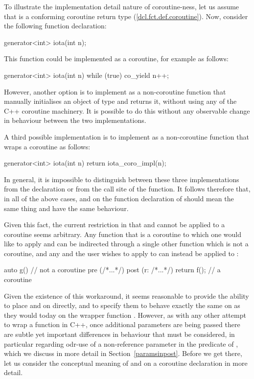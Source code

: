 To illustrate the implementation detail nature of coroutine-ness, let us assume that  is a conforming coroutine return type (\href{https://eel.is/c++draft/dcl.fct.def.coroutine}{[dcl.fct.def.coroutine]}). Now, consider the following function declaration:
\begin{codeblock}
generator<int> iota(int n); 
\end{codeblock}
This function could be implemented as a coroutine, for example as follows:
\begin{codeblock}
generator<int> iota(int n) {
  while (true)
    co_yield n++;
}
\end{codeblock}
However, another option is to implement  as a non-coroutine function that manually initialises an object of type  and returns it, without using any of the C++ coroutine machinery. It is possible to do this without any observable change in behaviour between the two implementations.

A third possible implementation is to implement  as a non-coroutine function that wraps a coroutine  as follows:
\begin{codeblock}
generator<int> iota(int n) {
  return iota_coro_impl(n);
}
\end{codeblock}
In general, it is impossible to distinguish between these three implementations from the declaration or from the call site of the function. It follows therefore that, in all of the above cases,  and  on the function declaration of  should mean the same thing and have the same behaviour.

Given this fact, the current restriction in \cite{P2900R8} that  and  cannot be applied to a coroutine seems arbitrary. Any function  that is a coroutine to which one would like to apply  and  can be indirected through a single other function  which is not a coroutine, and any  and  the user wishes to apply to  can instead be applied to :
\begin{codeblock}
auto g()  // not a coroutine
  pre (/*...*/) 
  post (r: /*...*/) 
{ 
  return f();  // a coroutine
} 
\end{codeblock}
Given the existence of this workaround, it seems reasonable to provide the ability to place  and  on  directly, and to specify them to behave exactly the same on  as they would today on the wrapper function . However, as with any other attempt to wrap a function in C++, once additional parameters are being passed there are subtle yet important differences in behaviour that must be considered, in particular regarding odr-use of a non-reference parameter in the predicate of , which we discuss in more detail in Section~\ref{paramsinpost}. Before we get there, let us consider the conceptual meaning of  and  on a coroutine declaration in more detail.

